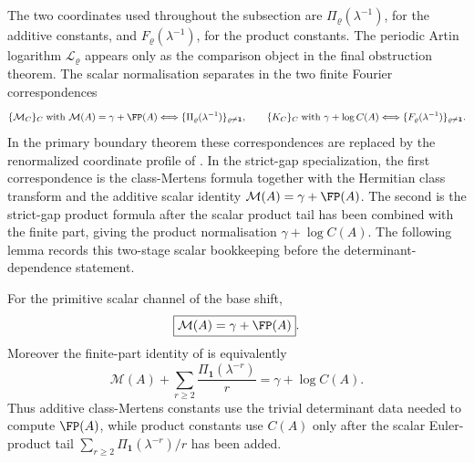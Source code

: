 The two coordinates used throughout the subsection are
\(\Pi_\varrho(\lambda^{-1})\), for the additive constants, and
\(F_\varrho(\lambda^{-1})\), for the product constants.  The periodic Artin
logarithm \(\mathcal L_\varrho\) appears only as the comparison object in the
final obstruction theorem.  The scalar normalisation separates in the two
finite Fourier correspondences
\[
  \{\mathcal M_C\}_C
  \;\text{with }\mathcal M(A)=\gamma+\FP(A)
  \Longleftrightarrow
  \{\Pi_\varrho(\lambda^{-1})\}_{\varrho\ne\mathbf1},
  \qquad
  \{K_C\}_C\;\text{with }\gamma+\log C(A)
  \Longleftrightarrow
  \{F_\varrho(\lambda^{-1})\}_{\varrho\ne\mathbf1}.
\]
In the primary boundary theorem these correspondences are replaced by the
renormalized coordinate profile of
.
In the strict-gap specialization, the first correspondence is the class-Mertens
formula together with the Hermitian class transform and the additive scalar
identity \(\mathcal M(A)=\gamma+\FP(A)\).  The second is the strict-gap product
formula after the scalar product tail has been combined with the finite part,
giving the product normalisation \(\gamma+\log C(A)\).  The following lemma records this
two-stage scalar bookkeeping before the determinant-dependence statement.

\begin{lemma}
  \label{lem:scalar-normalisation-two-stage}
  For the primitive scalar channel of the base shift,
  \[
    \boxed{\mathcal M(A)=\gamma+\FP(A)}.
  \]
  Moreover the finite-part identity of 
  is equivalently
  \[
    \boxed{
    \mathcal M(A)
    +\sum_{r\ge2}\frac{\Pi_{\mathbf1}(\lambda^{-r})}{r}
    =\gamma+\log C(A)}.
  \]
  Thus additive class-Mertens constants use the trivial determinant data needed
  to compute \(\FP(A)\), while product constants use \(C(A)\) only after the
  scalar Euler-product tail \(\sum_{r\ge2}\Pi_{\mathbf1}(\lambda^{-r})/r\)
  has been added.
\end{lemma}

